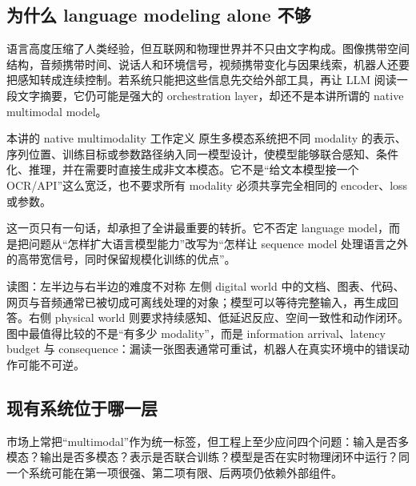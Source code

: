\subsection{为什么 language modeling alone 不够}

语言高度压缩了人类经验，但互联网和物理世界并不只由文字构成。图像携带空间结构，音频携带时间、说话人和环境信号，视频携带变化与因果线索，机器人还要把感知转成连续控制。若系统只能把这些信息先交给外部工具，再让 LLM 阅读一段文字摘要，它仍可能是强大的 orchestration layer，却还不是本讲所谓的 native multimodal model。


\begin{importantbox}{本讲的 native multimodality 工作定义}
原生多模态系统把不同 modality 的表示、序列位置、训练目标或参数路径纳入同一模型设计，使模型能够联合感知、条件化、推理，并在需要时直接生成非文本模态。它不是“给文本模型接一个 OCR/API”这么宽泛，也不要求所有 modality 必须共享完全相同的 encoder、loss 或参数。
\end{importantbox}

这一页只有一句话，却承担了全讲最重要的转折。它不否定 language model，而是把问题从“怎样扩大语言模型能力”改写为“怎样让 sequence model 处理语言之外的高带宽信号，同时保留规模化训练的优点”。


\begin{knowledgebox}{读图：左半边与右半边的难度不对称}
左侧 digital world 中的文档、图表、代码、网页与音频通常已被切成可离线处理的对象；模型可以等待完整输入，再生成回答。右侧 physical world 则要求持续感知、低延迟反应、空间一致性和动作闭环。图中最值得比较的不是“有多少 modality”，而是 information arrival、latency budget 与 consequence：漏读一张图表通常可重试，机器人在真实环境中的错误动作可能不可逆。
\end{knowledgebox}


\subsection{现有系统位于哪一层}

市场上常把“multimodal”作为统一标签，但工程上至少应问四个问题：输入是否多模态？输出是否多模态？表示是否联合训练？模型是否在实时物理闭环中运行？同一个系统可能在第一项很强、第二项有限、后两项仍依赖外部组件。

